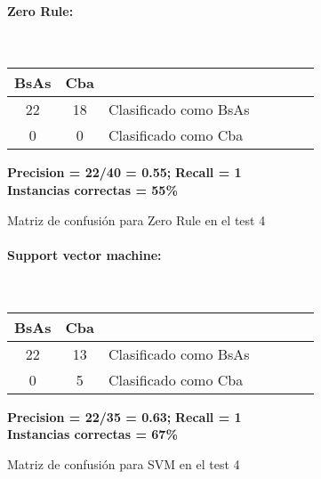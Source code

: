 \begin{figure}[H]
	\centering
	\paragraph*{Zero Rule:}\mbox{}\\
	\begin{table}[H]
		\centering
		\begin{tabular}{|c|c|l|c|c|c|c|}
			\hline
			BsAs & Cba &  \\ \hline
			22 &  18 &  Clasificado como BsAs \\ \hline
			0  &   0 &  Clasificado como Cba \\ \hline
		\end{tabular}
	\end{table}
	\begin{center}
		\textbf{Precision = 22/40 = 0.55;} \textbf{Recall = 1}\\
		\textbf{Instancias correctas = 55\%}
	\end{center}
	\caption{Matriz de confusión para Zero Rule en el test 4}
	\label{ZeroR_matrizconf}
\end{figure}

\begin{figure}[H]
	\centering
	\paragraph*{Support vector machine:}\mbox{}\\
	\begin{table}[H]
		\centering
		\begin{tabular}{|c|c|l|c|c|c|c|}
			\hline
			BsAs & Cba &  \\ \hline
			22 &  13 &  Clasificado como BsAs \\ \hline
			0  &   5 &  Clasificado como Cba \\ \hline
		\end{tabular}
	\end{table}
	\begin{center}
		\textbf{Precision = 22/35 = 0.63;} \textbf{Recall = 1}\\
		\textbf{Instancias correctas = 67\%}
	\end{center}
	\caption{Matriz de confusión para SVM en el test 4}
	\label{FSMO_matrizconf}
\end{figure}

